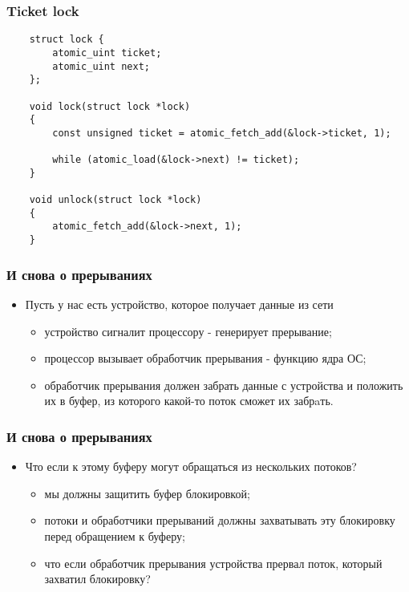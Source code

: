 \begin{frame}[fragile]
\frametitle{Ticket lock}
\begin{lstlisting}
    struct lock {
        atomic_uint ticket;
        atomic_uint next;
    };

    void lock(struct lock *lock)
    {
        const unsigned ticket = atomic_fetch_add(&lock->ticket, 1);

        while (atomic_load(&lock->next) != ticket);
    }

    void unlock(struct lock *lock)
    {
        atomic_fetch_add(&lock->next, 1);
    }
\end{lstlisting}
\end{frame}

\begin{frame}
\frametitle{И снова о прерываниях}
\begin{itemize}
    \item<1->Пусть у нас есть устройство, которое получает данные из сети
    \begin{itemize}
        \item<2->устройство сигналит процессору - генерирует прерывание;
        \item<3->процессор вызывает обработчик прерывания - функцию ядра ОС;
        \item<4->обработчик прерывания должен забрать данные с устройства и
             положить их в буфер, из которого какой-то поток сможет их забрaть.
    \end{itemize}
\end{itemize}
\end{frame}

\begin{frame}
\frametitle{И снова о прерываниях}
\begin{itemize}
    \item<1->Что если к этому буферу могут обращаться из нескольких потоков?
    \begin{itemize}
        \item<2->мы должны защитить буфер блокировкой;
        \item<3->потоки и обработчики прерываний должны захватывать эту
             блокировку перед обращением к буферу;
        \item<4->что если обработчик прерывания устройства прервал поток,
             который захватил блокировку?
    \end{itemize}
\end{itemize}
\end{frame}

